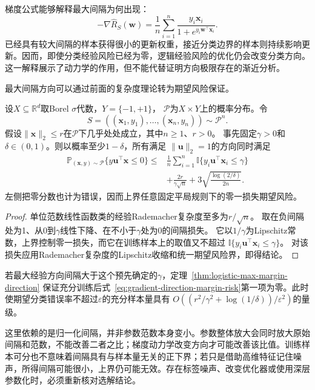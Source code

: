 梯度公式能够解释最大间隔为何出现：
\[
 -\nabla\hat R_S(\bm w)
 =\frac1n\sum_{i=1}^{n}
       \frac{y_i\bm x_i}{1+e^{y_i\bm w^\top\bm x_i}}.
\]
已经具有较大间隔的样本获得很小的更新权重，接近分类边界的样本则持续影响更新。因而，即使分类经验风险已经为零，逻辑经验风险的优化仍会改变分类方向。这一解释展示了动力学的作用，但不能代替证明方向极限存在的渐近分析。

最大间隔方向可以通过前面的复杂度理论转为期望风险保证。
\begin{theorem}[基于最大间隔的分类期望风险]
\label{thm:max-margin-classification-risk}
设$X\subseteq\mathbb R^d$取Borel $\sigma$代数，$Y=\{-1,+1\}$，
$\mathcal P$为$X\times Y$上的概率分布。令
\[
 S=((\bm x_1,y_1),\ldots,(\bm x_n,y_n))\sim\mathcal P^n.
\]
假设$\|\bm x\|_2\leq r$在$\mathcal P$下几乎处处成立，其中$n\geq1$、$r>0$。
事先固定$\gamma>0$和$\delta\in(0,1)$。则以概率至少$1-\delta$，所有满足
$\|\bm u\|_2=1$的方向同时满足
\begin{equation}
 \begin{aligned}
 \mathbb P_{(\bm x,y)\sim\mathcal P}\{y\bm u^\top\bm x\leq0\}
 \leq{}&\frac1n\sum_{i=1}^n
       \mathbb I\{y_i\bm u^\top\bm x_i\leq\gamma\}\\
 &+\frac{2r}{\gamma\sqrt n}
       +3\sqrt{\frac{\log(2/\delta)}{2n}}.
 \end{aligned}
 \label{eq:gradient-direction-margin-risk}
\end{equation}
左侧把零分数也计为错误，因而上界任意固定平局规则下的零一损失期望风险。
\end{theorem}
\begin{proof}
单位范数线性函数类的经验Rademacher复杂度至多为$r/\sqrt n$。
取在负间隔处为1、从0到$\gamma$线性下降、在不小于$\gamma$处为0的间隔损失。
它以$1/\gamma$为Lipschitz常数，上界控制零一损失，而它在训练样本上的取值又不超过
$\mathbb I\{y_i\bm u^\top\bm x_i\leq\gamma\}$。
对该损失应用Rademacher复杂度的Lipschitz收缩和统一期望风险界，即得结论。
\end{proof}

若最大经验方向间隔大于这个预先确定的$\gamma$，定理~\ref{thm:logistic-max-margin-direction}
保证充分训练后式~\eqref{eq:gradient-direction-margin-risk}第一项为零。此时使期望分类错误率不超过$\varepsilon$的充分样本量具有
$O((r^2/\gamma^2+\log(1/\delta))/\varepsilon^2)$的量级。

这里依赖的是归一化间隔，并非参数范数本身变小。参数整体放大会同时放大原始间隔和范数，不能改善二者之比；梯度动力学改变方向才可能改善该比值。训练样本可分也不意味着间隔具有与样本量无关的正下界；若只是借助高维特征记住噪声，所得间隔可能很小，上界仍可能无效。存在标签噪声、改变优化器或使用深层参数化时，必须重新核对选解结论。

